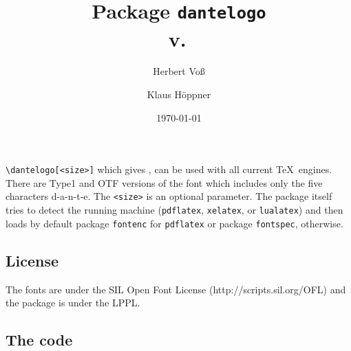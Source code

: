 \documentclass{article}
\let\FV\fileversion
\begin{document}
\title{Package \texttt{dantelogo}\\v.\,\FV}
\author{Herbert Voß \and Klaus Höppner}
\date{\today}
\maketitle

\verb|\dantelogo[<size>]| which gives \dantelogo, can be used with all current \TeX\ engines. There are Type1 and OTF versions
of the font which includes only the five characters d-a-n-t-e. The \verb|<size>| is an optional parameter. The package itself tries 
to detect the running machine (\texttt{pdflatex}, \texttt{xelatex}, or \texttt{lualatex}) and then loads by default 
package \verb|fontenc| for \texttt{pdflatex} or package \texttt{fontspec}, otherwise.

\begin{LTXexample}[width=0.4\linewidth]
\dantelogo\Huge\dantelogo
\end{LTXexample}

\begin{LTXexample}[width=0.4\linewidth]
\dantelogo[20pt]\dantelogo
\end{LTXexample}

\begin{LTXexample}[width=0.4\linewidth]
\bfseries\dantelogo\Huge\dantelogo
\end{LTXexample}

\begin{LTXexample}[width=0.4\linewidth]
\itshape\dantelogo[20pt]\dantelogo
\end{LTXexample}

\begin{LTXexample}[width=0.4\linewidth]
\bfseries\itshape\dantelogo\Huge\dantelogo
\end{LTXexample}

\subsection*{License}
The fonts are under the SIL Open Font License (http://scripts.sil.org/OFL) and
the package is under the LPPL.


\subsection*{The code}


\end{document}

